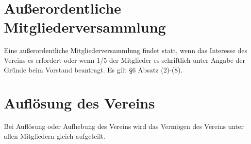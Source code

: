 \documentclass{scrartcl}
\begin{document}
    \section{Außerordentliche Mitgliederversammlung}
        Eine außerordentliche Mitgliederversammlung findet statt, wenn das Interesse des
        Vereins es erfordert oder wenn 1/5 der Mitglieder es schriftlich unter Angabe der Gründe beim
        Vorstand beantragt.
        Es gilt \S 6 Absatz (2)-(8).
    \section{Auflösung des Vereins}
        Bei Auflösung oder Aufhebung des Vereins wird das Vermögen des Vereins unter allen Mitgliedern gleich aufgeteilt.
\end{document}
